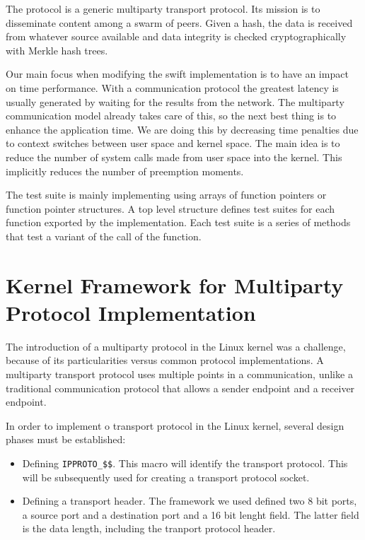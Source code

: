 The  protocol is a generic multiparty transport protocol. Its mission is to
disseminate content among a swarm of peers.  Given a hash, the data is
received from whatever source available and data integrity is checked
cryptographically with Merkle hash trees. 

Our main focus when modifying the swift implementation is to have an impact on
time performance. With a communication protocol the greatest latency is
usually generated by waiting for the results from the network. The multiparty
communication model already takes care of this, so the next best thing is to
enhance the application time. We are doing this by decreasing time
penalties due to context switches between user space and kernel space. The
main idea is to reduce the number of system calls made from user space into
the kernel. This implicitly reduces the number of preemption moments.

The test suite is mainly implementing using arrays of function pointers or
function pointer structures. A top level structure defines test suites for
each function exported by the implementation. Each test suite is a series of
methods that test a variant of the call of the function.

\section{Kernel Framework for Multiparty Protocol Implementation}
\label{sec:multiparty:kernel-framework}

The introduction of a multiparty protocol in the Linux kernel was a challenge,
because of its particularities versus common protocol implementations. A
multiparty transport protocol uses multiple points in a communication, unlike
a traditional communication protocol that allows a sender endpoint and a
receiver endpoint.

In order to implement o transport protocol in the Linux kernel, several design
phases must be established:

\begin{itemize}
  \item Defining \texttt{IPPROTO\_\$\$}. This macro will identify the
  transport protocol. This will be subsequently used for creating a transport
  protocol socket.
  \item Defining a transport header. The framework we used defined two 8 bit
  ports, a source port and a destination port and a 16 bit lenght field. The
  latter field is the data length, including the tranport protocol header.
\end{itemize}

